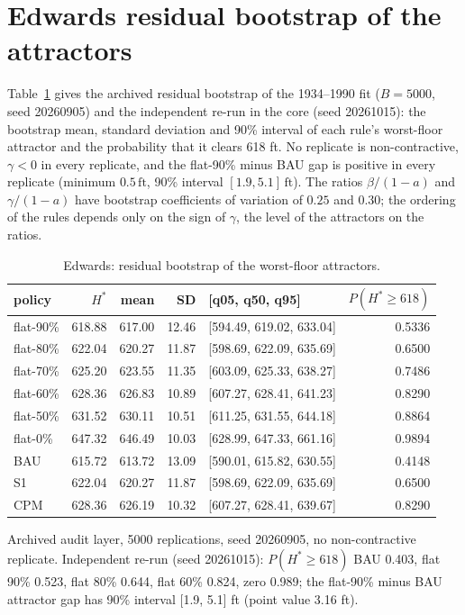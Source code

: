 \documentclass[11pt,a4paper]{article}
\newcommand{\ft}{\,\mathrm{ft}}
\begin{document}
\section{Edwards residual bootstrap of the attractors}\label{si:edw-boot}
Table~\ref{tab:si-edw-boot} gives the archived residual bootstrap of the 1934--1990 fit ($B=5000$, seed 20260905) and the independent re-run in the core (seed 20261015): the bootstrap mean, standard deviation and 90\% interval of each rule's worst-floor attractor and the probability that it clears 618 ft. No replicate is non-contractive, $\gamma<0$ in every replicate, and the flat-90\% minus BAU gap is positive in every replicate (minimum $0.5\ft$, 90\% interval $[1.9,5.1]\ft$). The ratios $\beta/(1-a)$ and $\gamma/(1-a)$ have bootstrap coefficients of variation of $0.25$ and $0.30$; the ordering of the rules depends only on the sign of $\gamma$, the level of the attractors on the ratios.
\begin{table}[H]
\centering
\caption{Edwards: residual bootstrap of the worst-floor attractors.}
\label{tab:si-edw-boot}
\small
\begin{tabular}{lrrrlr}
\toprule
policy & $H^*$ & mean & SD & [q05, q50, q95] & $P(H^*\ge618)$ \\
\midrule
flat-90\% & 618.88 & 617.00 & 12.46 & [594.49, 619.02, 633.04] & 0.5336 \\
flat-80\% & 622.04 & 620.27 & 11.87 & [598.69, 622.09, 635.69] & 0.6500 \\
flat-70\% & 625.20 & 623.55 & 11.35 & [603.09, 625.33, 638.27] & 0.7486 \\
flat-60\% & 628.36 & 626.83 & 10.89 & [607.27, 628.41, 641.23] & 0.8290 \\
flat-50\% & 631.52 & 630.11 & 10.51 & [611.25, 631.55, 644.18] & 0.8864 \\
flat-0\% & 647.32 & 646.49 & 10.03 & [628.99, 647.33, 661.16] & 0.9894 \\
BAU & 615.72 & 613.72 & 13.09 & [590.01, 615.82, 630.55] & 0.4148 \\
S1 & 622.04 & 620.27 & 11.87 & [598.69, 622.09, 635.69] & 0.6500 \\
CPM & 628.36 & 626.19 & 10.32 & [607.27, 628.41, 639.67] & 0.8290 \\
\bottomrule
\end{tabular}
\par\smallskip\begin{minipage}{0.97\linewidth}\footnotesize Archived audit layer, 5000 replications, seed 20260905, no non-contractive replicate. Independent re-run (seed 20261015): $P(H^*\ge618)$ BAU 0.403, flat 90\% 0.523, flat 80\% 0.644, flat 60\% 0.824, zero 0.989; the flat-90\% minus BAU attractor gap has 90\% interval [1.9, 5.1] ft (point value 3.16 ft).\end{minipage}
\end{table}
\end{document}
